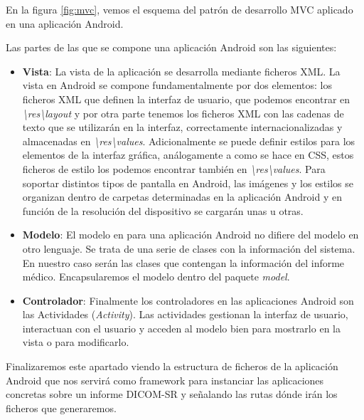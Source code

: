 En la figura \ref{fig:mvc}, vemos el esquema del patrón de desarrollo MVC aplicado en una aplicación Android.\par
Las partes de las que se compone una aplicación Android son las siguientes:
\begin{itemize}
\item \textbf{Vista}: La vista de la aplicación se desarrolla mediante ficheros XML. La vista en Android se compone fundamentalmente por dos elementos: los ficheros XML que definen la interfaz de usuario, que podemos encontrar en \emph{\textbackslash{res}\textbackslash{layout}} y por otra parte tenemos los ficheros XML con las cadenas de texto que se utilizarán en la interfaz, correctamente internacionalizadas y almacenadas en \emph{\textbackslash{res}\textbackslash{values}}. Adicionalmente se puede definir estilos para los elementos de la interfaz gráfica, análogamente a como se hace en CSS, estos ficheros de estilo los podemos encontrar también en \emph{\textbackslash{res}\textbackslash{values}}. Para soportar distintos tipos de pantalla en Android, las imágenes y los estilos se organizan dentro de carpetas determinadas en la aplicación Android y en función de la resolución del dispositivo se cargarán unas u otras.
\item \textbf{Modelo}: El modelo en para una aplicación Android no difiere del modelo en otro lenguaje. Se trata de una serie de clases con la información del sistema. En nuestro caso serán las clases que contengan la información del informe médico. Encapsularemos el modelo dentro del paquete \emph{model}.
\item \textbf{Controlador}: Finalmente los controladores en las aplicaciones Android son las Actividades (\emph{Activity}). Las actividades gestionan la interfaz de usuario, interactuan con el usuario y acceden al modelo bien para mostrarlo en la vista o para modificarlo. 
\end{itemize}

Finalizaremos este apartado viendo la estructura de ficheros de la aplicación Android que nos servirá como framework para instanciar las aplicaciones concretas sobre un informe DICOM-SR y señalando las rutas dónde irán los ficheros que generaremos.\par

